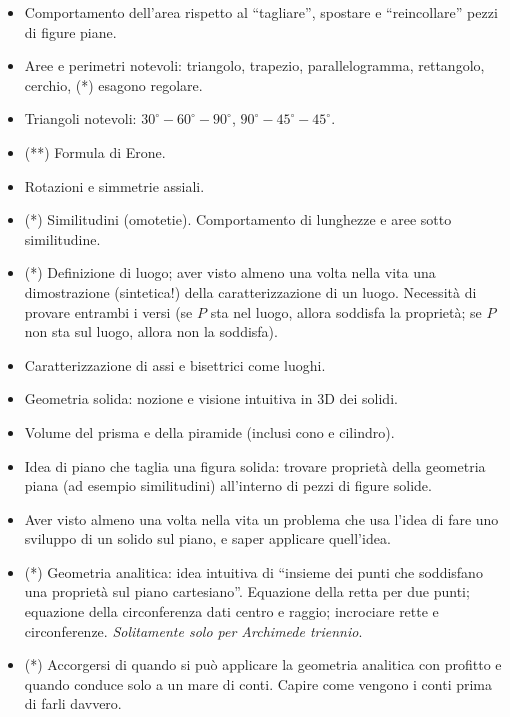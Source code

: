 \documentclass[a4paper,10pt]{paper}
\renewcommand{\star}{(*)}
\newcommand{\sstar}{(**)}
\begin{document}
\begin{itemize}
 \item Comportamento dell'area rispetto al ``tagliare'', spostare e ``reincollare'' pezzi di figure piane.
 \item Aree e perimetri notevoli: triangolo, trapezio, parallelogramma, rettangolo, cerchio, \star{} esagono regolare.
 \item Triangoli notevoli: $30^\circ-60^\circ-90^\circ$, $90^\circ-45^\circ-45^\circ$.
 \item \sstar{} Formula di Erone.
 \item Rotazioni e simmetrie assiali.
 \item \star{} Similitudini (omotetie). Comportamento di lunghezze e aree sotto similitudine.
 \item \star{} Definizione di luogo; aver visto almeno una volta nella vita una dimostrazione (sintetica!) della caratterizzazione di un luogo. Necessità di provare entrambi i versi (se $P$ sta nel luogo, allora soddisfa la proprietà; se $P$ non sta sul luogo, allora non la soddisfa).
 \item Caratterizzazione di assi e bisettrici come luoghi.
 \item Geometria solida: nozione e visione intuitiva in 3D dei solidi.
 \item  Volume del prisma e della piramide (inclusi cono e cilindro).
 \item Idea di piano che taglia una figura solida: trovare proprietà della geometria piana (ad esempio similitudini) all'interno di pezzi di figure solide.
 \item Aver visto almeno una volta nella vita un problema che usa l'idea di fare uno sviluppo di un solido sul piano, e saper applicare quell'idea.
 \item \star{} Geometria analitica: idea intuitiva di ``insieme dei punti che soddisfano una proprietà sul piano cartesiano''. Equazione della retta per due punti; equazione della circonferenza dati centro e raggio; incrociare rette e circonferenze. \emph{Solitamente solo per Archimede triennio}.
 \item \star{} Accorgersi di quando si può applicare la geometria analitica con profitto e quando conduce solo a un mare di conti. Capire come vengono i conti prima di farli davvero.
\end{itemize}
\end{document}
